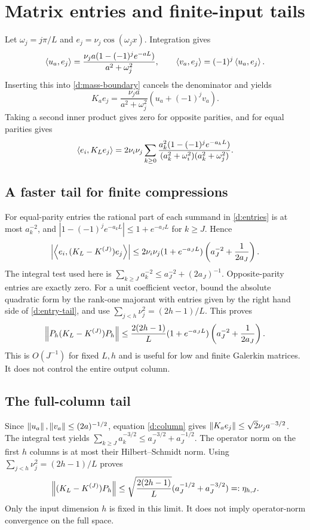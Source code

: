 \section{Matrix entries and finite-input tails}
Let $\omega_j=j\pi/L$ and $e_j=\nu_j\cos(\omega_jx)$. Integration gives
\[
\left\langle u_a,e_j\right\rangle=\frac{\nu_ja(1-(-1)^je^{-aL})}{a^2+\omega_j^2},\qquad
\left\langle v_a,e_j\right\rangle=(-1)^j\left\langle u_a,e_j\right\rangle.
\]
Inserting this into \eqref{d:mass-boundary} cancels the denominator and yields
\begin{equation}\label{d:column}
K_ae_j=\frac{\nu_ja}{a^2+\omega_j^2}(u_a+(-1)^jv_a).
\end{equation}
Taking a second inner product gives zero for opposite parities, and for
equal parities gives
\begin{equation}\label{d:entries}
\left\langle e_i,K_Le_j\right\rangle=2\nu_i\nu_j\sum_{k\ge0}
\frac{a_k^2(1-(-1)^je^{-a_kL})}
{(a_k^2+\omega_i^2)(a_k^2+\omega_j^2)}.
\end{equation}
\subsection{A faster tail for finite compressions}
For equal-parity entries the rational part of each summand in
\eqref{d:entries} is at most $a_k^{-2}$, and
$|1-(-1)^je^{-a_kL}|\le1+e^{-a_JL}$ for $k\ge J$. Hence
\begin{equation}\label{d:entry-tail}
\left|\left\langle e_i,(K_L-K^{(J)})e_j\right\rangle\right|
\le2\nu_i\nu_j(1+e^{-a_JL})
\left(a_J^{-2}+\frac1{2a_J}\right).
\end{equation}
The integral test used here is
$\sum_{k\ge J}a_k^{-2}\le a_J^{-2}+(2a_J)^{-1}$.
Opposite-parity entries are exactly zero. For a unit coefficient vector,
bound the absolute quadratic form by the rank-one majorant with entries
given by the right hand side of \eqref{d:entry-tail}, and use
$\sum_{j<h}\nu_j^2=(2h-1)/L$. This proves
\begin{equation}\label{d:compression-tail}
\left\lVert P_h(K_L-K^{(J)})P_h\right\rVert
\le\frac{2(2h-1)}L(1+e^{-a_JL})
\left(a_J^{-2}+\frac1{2a_J}\right).
\end{equation}
This is $O(J^{-1})$ for fixed $L,h$ and is useful for low and finite
Galerkin matrices. It does not control the entire output column.

\subsection{The full-column tail}
Since $\left\lVert u_a\right\rVert,\left\lVert v_a\right\rVert\le(2a)^{-1/2}$, equation \eqref{d:column}
gives $\left\lVert K_ae_j\right\rVert\le\sqrt2\nu_ja^{-3/2}$.
The integral test yields
$\sum_{k\ge J}a_k^{-3/2}\le a_J^{-3/2}+a_J^{-1/2}$.
The operator norm on the first $h$ columns is at most their Hilbert--Schmidt
norm. Using $\sum_{j<h}\nu_j^2=(2h-1)/L$ proves
\begin{equation}\label{d:column-tail}
\left\lVert(K_L-K^{(J)})P_h\right\rVert\le
\sqrt{\frac{2(2h-1)}L}(a_J^{-1/2}+a_J^{-3/2})=:\eta_{h,J}.
\end{equation}
Only the input dimension $h$ is fixed in this limit. It does not imply
operator-norm convergence on the full space.

